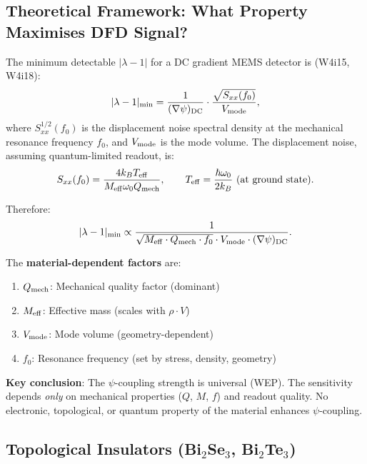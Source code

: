 \documentclass[11pt]{article}
\theoremstyle{remark}
\begin{document}
\subsection{Theoretical Framework: What Property Maximises DFD Signal?}

The minimum detectable $|\lambda - 1|$ for a DC gradient MEMS
detector is (W4i15, W4i18):
\begin{equation}
  |\lambda - 1|_{\min} = \frac{1}{(\nabla\psi)_{\rm DC}}
  \cdot \frac{\sqrt{S_{xx}(f_0)}}{V_{\rm mode}},
  \label{eq:sensitivity}
\end{equation}
where $S_{xx}^{1/2}(f_0)$ is the displacement noise spectral density
at the mechanical resonance frequency $f_0$, and $V_{\rm mode}$ is the
mode volume. The displacement noise, assuming quantum-limited readout,
is:
\begin{equation}
  S_{xx}(f_0) = \frac{4 k_B T_{\rm eff}}{M_{\rm eff} \omega_0 Q_{\rm mech}},
  \qquad T_{\rm eff} = \frac{\hbar \omega_0}{2 k_B}
  \text{ (at ground state)}.
  \label{eq:noise}
\end{equation}

Therefore:
\begin{equation}
  |\lambda - 1|_{\min} \propto
  \frac{1}{\sqrt{M_{\rm eff} \cdot Q_{\rm mech} \cdot f_0}
  \cdot V_{\rm mode} \cdot (\nabla\psi)_{\rm DC}}.
  \label{eq:scaling}
\end{equation}

The \textbf{material-dependent factors} are:
\begin{enumerate}[nosep]
  \item $Q_{\rm mech}$: Mechanical quality factor (dominant)
  \item $M_{\rm eff}$: Effective mass (scales with $\rho \cdot V$)
  \item $V_{\rm mode}$: Mode volume (geometry-dependent)
  \item $f_0$: Resonance frequency (set by stress, density, geometry)
\end{enumerate}

\textbf{Key conclusion}: The $\psi$-coupling strength is universal
(WEP). The sensitivity depends \emph{only} on mechanical properties
($Q$, $M$, $f$) and readout quality. No electronic, topological, or
quantum property of the material enhances $\psi$-coupling.

\subsection{Topological Insulators (Bi$_2$Se$_3$, Bi$_2$Te$_3$)}
\end{document}

